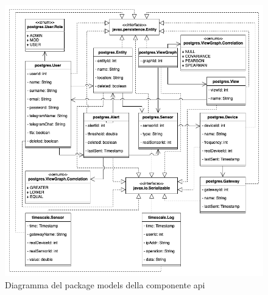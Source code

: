 		\begin{figure}[H]
			\centering
			\includegraphics[scale=0.550]{res/images/API/ModelsPackage.png}
			\caption{Diagramma del package models della componente api}
			\label{Diagramma 14}
		\end{figure}
